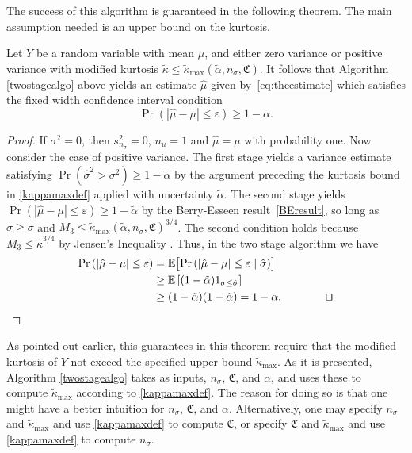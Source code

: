 \documentclass[graybox]{svmult}
\newcommand{\fudge}{\mathfrak{C}}
\newcommand\e{\mathbb{E}}
\newcommand{\Prob}{\Pr}
\newcommand{\abs}[1]{\left|#1\right|}
\newcommand{\hmu}{\hat{\mu}}
\newcommand{\hsigma}{\hat{\sigma}}
\newcommand{\tkappa}{\tilde{\kappa}}
\def\abs#1{\ensuremath{\left \lvert #1 \right \rvert}}
\begin{document}
The success of this algorithm is guaranteed in the following theorem.  The main assumption needed is an upper bound on the kurtosis.

\begin{theorem} \label{mainadaptthm} 
Let $Y$ be a random variable with mean $\mu$, and either zero variance or positive variance with modified kurtosis $\tkappa \le \tilde\kappa_{\max}(\tilde\alpha,n_\sigma,\fudge)$.  It follows that Algorithm \ref{twostagealgo} above yields an estimate
$\hat\mu$ given by~\eqref{eq:theestimate} which satisfies the fixed width confidence interval condition
$$\Pr( |\hat\mu-\mu|\le\varepsilon)\ge 1-\alpha.$$
\end{theorem}
\begin{proof}
\smartqed  
If $\sigma^2=0$, then $s_{n_\sigma}^2=0$, $n_\mu=1$ and $\hmu=\mu$ with probability one.  Now consider the case of positive variance.
The first stage yields a variance estimate satisfying
$
\Pr( \hsigma^2 >\sigma^2)\ge 1-\tilde\alpha
$
by the argument preceding the kurtosis bound in \eqref{kappamaxdef} applied with uncertainty $\tilde\alpha$.
The second stage yields
$\Pr( |\hat\mu-\mu|\le\varepsilon)\ge 1-\tilde\alpha$
by the Berry-Esseen result~\eqref{BEresult},
so long as $\hat\sigma\ge\sigma$
and $M_3\le \tilde\kappa_{\max}(\tilde\alpha,n_\sigma,\fudge)^{3/4}$.
The second condition holds because $M_3 \le \tkappa^{3/4}$ by Jensen's Inequality \citep[8.4.b]{LinBai10a}.
Thus, in the two stage algorithm we have
\begin{align*}
\Prob\left(\abs{\hmu-\mu} \le \varepsilon \right) &
= \e\bigl[\Prob\left(\abs{\hmu-\mu} \le \varepsilon \mid \hsigma \right) \bigr] \\
& \ge \e\left[(1-\tilde\alpha) 1_{\sigma\le\hsigma}\right]\\
& \ge (1-\tilde\alpha) (1-\tilde\alpha) = 1-\alpha.\qquad \qquad \qed
\end{align*}
\end{proof}

\begin{remark} As pointed out earlier, this guarantees in this theorem require that the modified kurtosis of $Y$ not exceed the specified upper bound $\tkappa_{\max}$.  As it is presented, Algorithm \ref{twostagealgo} takes as inputs, $n_\sigma$, $\fudge$, and $\alpha$, and uses these to compute  $\tkappa_{\max}$ according to \eqref{kappamaxdef}.  The reason for doing so is that one might have a better intuition for $n_\sigma$, $\fudge$, and $\alpha$.  Alternatively, one may specify $n_\sigma$ and $\tkappa_{\max}$ and use \eqref{kappamaxdef} to compute $\fudge$, or specify $\fudge$ and $\tkappa_{\max}$ and use \eqref{kappamaxdef} to compute $n_\sigma$.
\end{remark}
\end{document}
